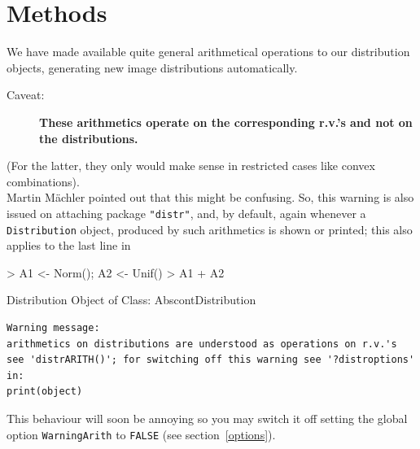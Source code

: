 \documentclass[11pt]{article}
\newcommand{\code}[1]{{\tt #1}}
\newcommand{\pkg}[1]{{\tt "#1"}}
\begin{document}
\section{Methods}\label{methods}
%
We have made available quite general arithmetical operations to our distribution
objects, generating new image distributions automatically.

\begin{description}
  \item[{\Large \sc Caveat:\/}] {\bf These arithmetics
operate on the corresponding r.v.'s and {\bf not} on the distributions.}
\end{description}
(For the latter, they only would make sense in restricted cases like convex
 combinations).\\

Martin M\"achler pointed out that this might be confusing. So, this warning is
also issued on attaching package \pkg{distr}, and,  by default, again whenever a
\code{Distribution} object, produced by such arithmetics is shown or printed;
this also applies to the last line in
\begin{Schunk}
\begin{Sinput}
>   A1 <- Norm(); A2 <- Unif()
>   A1 + A2
\end{Sinput}
\begin{Soutput}
Distribution Object of Class: AbscontDistribution
\end{Soutput}
\end{Schunk}
\begin{verbatim}
Warning message:
arithmetics on distributions are understood as operations on r.v.'s
see 'distrARITH()'; for switching off this warning see '?distroptions' in:
print(object)
\end{verbatim}
This behaviour will soon be annoying so you may switch it off setting the global
option
\code{WarningArith} to \code{FALSE} (see section~\ref{options}).
%
\end{document}
